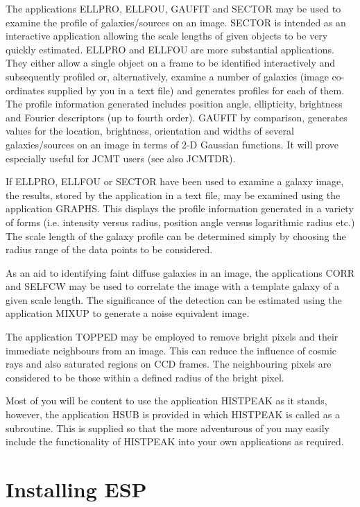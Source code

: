 \documentclass[twoside,11pt]{article}
\newcommand{\xref}[3]{#1}
\begin{document}
The applications ELLPRO, ELLFOU, GAUFIT and SECTOR may be used to examine the
profile of galaxies/sources on an image. SECTOR is intended as an interactive
application allowing the scale lengths of given objects to be very
quickly estimated. ELLPRO and ELLFOU are more substantial applications.
They either allow a single object on a frame to be identified
interactively and subsequently profiled or, alternatively, examine a
number of galaxies (image co-ordinates supplied by you in a text file)
and generates profiles for each of them.  The profile information
generated includes position angle, ellipticity, brightness and Fourier
descriptors (up to fourth order). GAUFIT by comparison, generates
values for the location, brightness, orientation and widths of several 
galaxies/sources on an image in terms of 2-D Gaussian functions. It will prove 
especially useful for JCMT users (see also \xref{JCMTDR}{sun132}{}).  

If ELLPRO, ELLFOU or SECTOR have been used to examine a galaxy image,
the results, stored by the application in a text file, may be examined 
using the application GRAPHS. This displays the profile information 
generated in a variety of forms (i.e. intensity versus radius, 
position angle versus logarithmic radius etc.) The scale length of the
galaxy profile can be determined simply by choosing the radius range 
of the data points to be considered.

As an aid to identifying faint diffuse galaxies in an image, the applications
CORR and SELFCW may be used to correlate the image with a template 
galaxy of a given scale length. The significance of the detection can
be estimated using the application MIXUP to generate a noise equivalent
image. 

The application TOPPED may be employed to remove bright pixels and their
immediate neighbours from an image. This can reduce the influence of cosmic
rays and also saturated regions on CCD frames. The neighbouring pixels are 
considered to be those within a defined radius of the bright pixel.

Most of you will be content to use the application HISTPEAK as it stands,
however, the application HSUB is provided in which HISTPEAK is called as
a subroutine. This is supplied so that the more adventurous of you may
easily include the functionality of HISTPEAK into your own
applications as required.


\section{Installing ESP}
\label{sec:installing}
\end{document}
